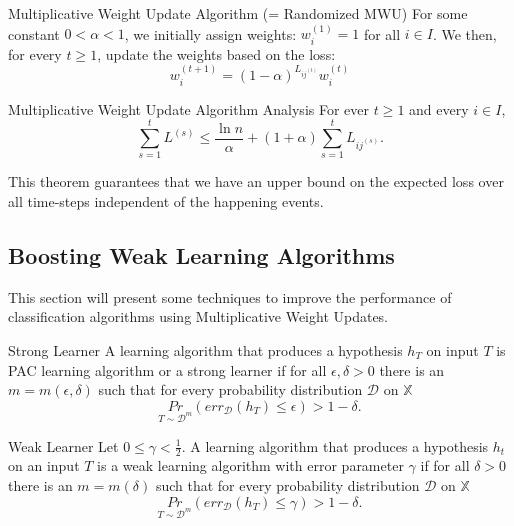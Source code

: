 \documentclass[english]{panikzettel}
\begin{document}
\begin{halfboxl}
\vspace{-\baselineskip}
\begin{algo}{Multiplicative Weight Update Algorithm (= Randomized MWU)}
For some constant $0 < \alpha < 1$, we initially assign weights:
$w_i^{(1)} = 1$ for all $i \in I$.
We then, for every $t \geq 1$, update the weights based on the loss:
$$
w_i^{(t + 1)} =  (1 - \alpha)^{L_{ij^{(t)}}} w_i^{(t)}
$$
\end{algo}
\end{halfboxl}
\begin{halfboxr}
\vspace{-\baselineskip}
\begin{theo}{Multiplicative Weight Update Algorithm Analysis}
For ever $t \geq 1$ and every $i \in I$,
$$
\sum_{s = 1}^t L^{(s)} \leq \frac{\ln n}{\alpha} + (1 + \alpha) \sum_{s = 1}^t L_{ij^{(s)}}.
$$
\end{theo}
This theorem guarantees that we have an upper bound on the expected loss over all time-steps independent of the happening events.
\end{halfboxr}


\subsection{Boosting Weak Learning Algorithms}
This section will present some techniques to improve the performance of classification algorithms using Multiplicative Weight Updates.

\begin{defi}{Strong Learner}
A learning algorithm that produces a hypothesis $h_T$ on input $T$ is PAC learning algorithm or a strong learner if for all $\epsilon,\delta>0$ there is an $m=m(\epsilon,\delta)$ such that for every probability distribution $\mathcal{D}$ on $\mathbb{X}$
\[
\underset{T\sim \mathcal{D}^m}{Pr} (err_\mathcal{D}(h_T)\leq \epsilon) > 1-\delta.
\]
\end{defi}

\begin{defi}{Weak Learner}
Let $0\leq \gamma<\frac{1}{2}$. A learning algorithm that produces a hypothesis $h_t$ on an input $T$ is a weak learning algorithm with error parameter $\gamma$ if for all $\delta > 0$ there is an $m=m(\delta)$ such that for every probability distribution $\mathcal{D}$ on $\mathbb{X}$
\[
\underset{T\sim \mathcal{D}^m}{Pr} (err_\mathcal{D}(h_T)\leq \gamma) > 1-\delta.
\]
\end{defi}
\end{document}
